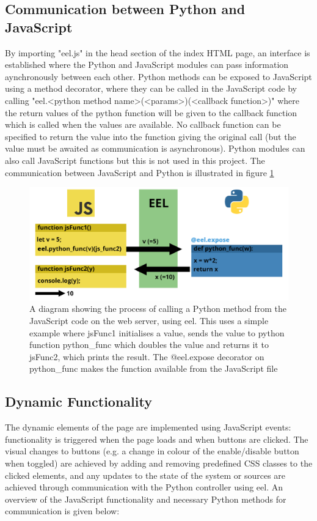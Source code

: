 \documentclass{l4proj}
\begin{document}
\subsection{Communication between Python and JavaScript}
By importing "eel.js" in the head section of the index HTML page, an interface is established where the Python and JavaScript modules can pass information aynchronously between each other. Python methods can be exposed to JavaScript using a method decorator, where they can be called in the JavaScript code by calling "eel.<python method name>(<params>)(<callback function>)" where the return values of the python function will be given to the callback function which is called when the values are available. No callback function can be specified to return the value into the function giving the original call (but the value must be awaited as communication is asynchronous). Python modules can also call JavaScript functions but this is not used in this project. The communication between JavaScript and Python is illustrated in figure \ref{fig:eel-communication}

\begin{figure}[!ht]
\includegraphics[width=\textwidth]{images/eel-communication.png}
\caption{A diagram showing the process of calling a Python method from the JavaScript code on the web server, using eel. This uses a simple example where jsFunc1 initialises a value, sends the value to python function python\_func which doubles the value and returns it to jsFunc2, which prints the result. The @eel.expose decorator on python\_func makes the function available from the JavaScript file}
\label{fig:eel-communication}
\end{figure}

\subsection{Dynamic Functionality}
The dynamic elements of the page are implemented using JavaScript events: functionality is triggered when the page loads and when buttons are clicked. The visual changes to buttons (e.g. a change in colour of the enable/disable button when toggled) are achieved by adding and removing predefined CSS classes to the clicked elements, and any updates to the state of the system or sources are achieved through communication with the Python controller using eel. An overview of the JavaScript functionality and necessary Python methods for communication is given below:
\end{document}
